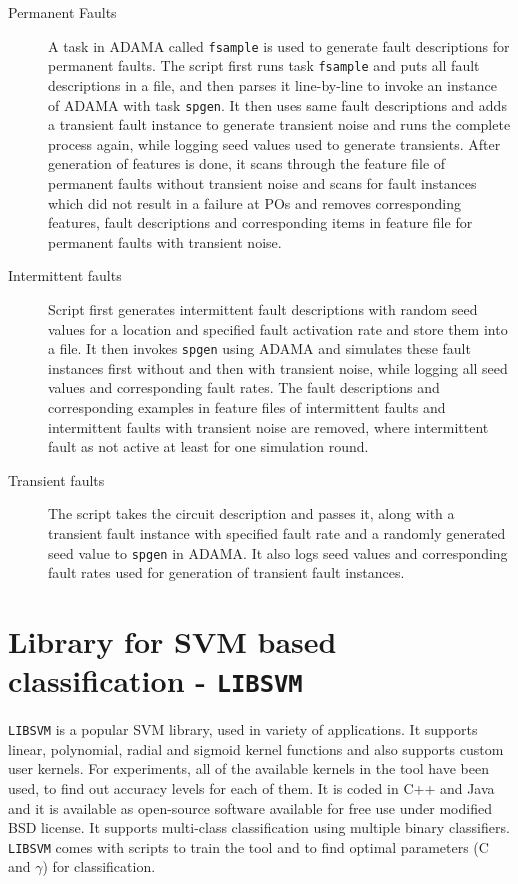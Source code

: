 \begin{description}
  \item[Permanent Faults] A task in ADAMA called \texttt{fsample} is used to generate fault descriptions for permanent faults. The script first runs task \texttt{fsample} and puts all fault descriptions in a file, and then parses it line-by-line to invoke an instance of ADAMA with task \texttt{spgen}. It then uses same fault descriptions and adds a transient fault instance to generate transient noise and runs the complete process again, while logging seed values used to generate transients. After generation of features is done, it scans through the feature file of permanent faults without transient noise and scans for fault instances which did not result in a failure at POs and removes corresponding features, fault descriptions and corresponding items in feature file for permanent faults with transient noise.

  \item[Intermittent faults] Script first generates intermittent fault descriptions with random seed values for a location and specified fault activation rate and store them into a file. It then invokes \texttt{spgen} using ADAMA and simulates these fault instances first without and then with transient noise, while logging all seed values and corresponding fault rates. The fault descriptions and corresponding examples in feature files of intermittent faults and intermittent faults with transient noise are removed, where intermittent fault as not active at least for one simulation round.

  \item[Transient faults] The script takes the circuit description and passes it, along with a transient fault instance with specified fault rate and a randomly generated seed value to \texttt{spgen} in ADAMA. It also logs seed values and corresponding fault rates used for generation of transient fault instances.
\end{description}

\section{Library for SVM based classification - \texttt{LIBSVM}}
\label{sec:libsvm}
\texttt{LIBSVM} \cite{Chang2011} is a popular SVM library, used in variety of applications. It supports linear, polynomial, radial and sigmoid kernel functions and also supports custom user kernels. For experiments, all of the available kernels in the tool have been used, to find out accuracy levels for each of them. It is coded in C++ and Java and it is available as open-source software available for free use under modified BSD license. It supports multi-class classification using multiple binary classifiers. \texttt{LIBSVM} comes with scripts to train the tool and to find optimal parameters (C and $\gamma$) for classification.

